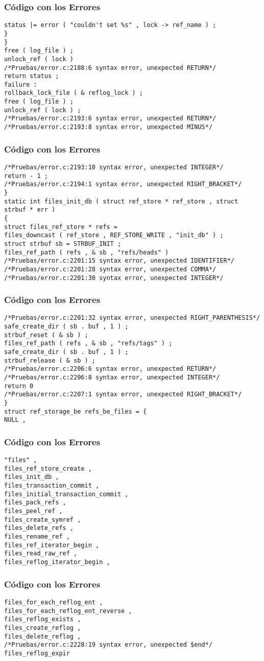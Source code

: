 \documentclass{beamer}
\begin{document}
\begin{frame}[fragile]
\frametitle{C\'odigo con los Errores}
\begin{verbatim}
status |= error ( "couldn't set %s" , lock -> ref_name ) ; 
} 
} 
free ( log_file ) ; 
unlock_ref ( lock ) 
/*Pruebas/error.c:2188:6 syntax error, unexpected RETURN*/
return status ; 
failure : 
rollback_lock_file ( & reflog_lock ) ; 
free ( log_file ) ; 
unlock_ref ( lock ) ; 
/*Pruebas/error.c:2193:6 syntax error, unexpected RETURN*/
/*Pruebas/error.c:2193:8 syntax error, unexpected MINUS*/
\end{verbatim}
\end{frame}
\begin{frame}[fragile]
\frametitle{C\'odigo con los Errores}
\begin{verbatim}
/*Pruebas/error.c:2193:10 syntax error, unexpected INTEGER*/
return - 1 ; 
/*Pruebas/error.c:2194:1 syntax error, unexpected RIGHT_BRACKET*/
} 
static int files_init_db ( struct ref_store * ref_store , struct strbuf * err ) 
{ 
struct files_ref_store * refs = 
files_downcast ( ref_store , REF_STORE_WRITE , "init_db" ) ; 
struct strbuf sb = STRBUF_INIT ; 
files_ref_path ( refs , & sb , "refs/heads" ) 
/*Pruebas/error.c:2201:15 syntax error, unexpected IDENTIFIER*/
/*Pruebas/error.c:2201:28 syntax error, unexpected COMMA*/
/*Pruebas/error.c:2201:30 syntax error, unexpected INTEGER*/
\end{verbatim}
\end{frame}
\begin{frame}[fragile]
\frametitle{C\'odigo con los Errores}
\begin{verbatim}
/*Pruebas/error.c:2201:32 syntax error, unexpected RIGHT_PARENTHESIS*/
safe_create_dir ( sb . buf , 1 ) ; 
strbuf_reset ( & sb ) ; 
files_ref_path ( refs , & sb , "refs/tags" ) ; 
safe_create_dir ( sb . buf , 1 ) ; 
strbuf_release ( & sb ) ; 
/*Pruebas/error.c:2206:6 syntax error, unexpected RETURN*/
/*Pruebas/error.c:2206:8 syntax error, unexpected INTEGER*/
return 0 
/*Pruebas/error.c:2207:1 syntax error, unexpected RIGHT_BRACKET*/
} 
struct ref_storage_be refs_be_files = { 
NULL , 
\end{verbatim}
\end{frame}
\begin{frame}[fragile]
\frametitle{C\'odigo con los Errores}
\begin{verbatim}
"files" , 
files_ref_store_create , 
files_init_db , 
files_transaction_commit , 
files_initial_transaction_commit , 
files_pack_refs , 
files_peel_ref , 
files_create_symref , 
files_delete_refs , 
files_rename_ref , 
files_ref_iterator_begin , 
files_read_raw_ref , 
files_reflog_iterator_begin , 
\end{verbatim}
\end{frame}
\begin{frame}[fragile]
\frametitle{C\'odigo con los Errores}
\begin{verbatim}
files_for_each_reflog_ent , 
files_for_each_reflog_ent_reverse , 
files_reflog_exists , 
files_create_reflog , 
files_delete_reflog , 
/*Pruebas/error.c:2228:19 syntax error, unexpected $end*/
files_reflog_expir \end{verbatim}
\end{frame}
\end{document}

